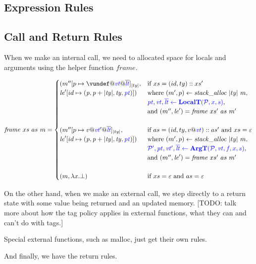 \documentclass[acmsmall,review,anonymous]{acmart}\settopmatter{printfolios=true,printccs=false,printacmref=false}
\begin{document}
\subsection{Expression Rules}

\expressions

\subsection{Call and Return Rules}

\callexprstep

When we make an internal call, we need to allocated space for locals and arguments using the helper function
\(\mathit{frame}\).

\[\mathit{frame} ~ xs ~ as ~ \mem =
\begin{cases}
  (\mem''[p \mapsto \vundef@\vt@\overline{\lt}]_{|ty|}, & \textnormal{if } xs = (id,ty)::xs' \\
  \lenv'[id \mapsto (\mathit{p, p+|ty|,ty,\pt})]) &
  \textnormal{where } (\mem',p) \leftarrow \mathit{stack\_alloc} ~ |ty| ~ \mem, \\
  & \trule{\localtres}{\localt}, \\
  & \textnormal{and } (\mem'',\lenv') = \mathit{frame} ~ xs' ~ as ~ m' \\ 
  \\
  (\mem''[p \mapsto v@\vt'@\overline{\lt}]_{|ty|}, & \textnormal{if } as = (id,ty,v @ \vt)::as' \textnormal{ and } xs = \varepsilon \\
  \lenv'[id \mapsto (\mathit{p, p+|ty|,ty,\pt})]) &
  \textnormal{where } (\mem',p) \leftarrow \mathit{stack\_alloc} ~ |ty| ~ \mem, \\
  & \trule{\argtres}{\argt}, \\
  & \textnormal{and } (\mem'',\lenv') = \mathit{frame} ~ xs' ~ as ~ m' \\
  \\
  (\mem, \lambda x . \bot) & \textnormal{if } xs = \varepsilon \textnormal{ and } as = \varepsilon \\
\end{cases}\]

\callstep

On the other hand, when we make an external call, we step directly to a return state with some value
being returned and an updated memory. [TODO: talk more about how the tag policy applies in external
  functions, what they can and can't do with tags.]

\extcallstep

Special external functions, such as malloc, just get their own rules.

\mallocstep

And finally, we have the return rules.

\returnstep
\retvalstep
\retnovalstep
\end{document}
